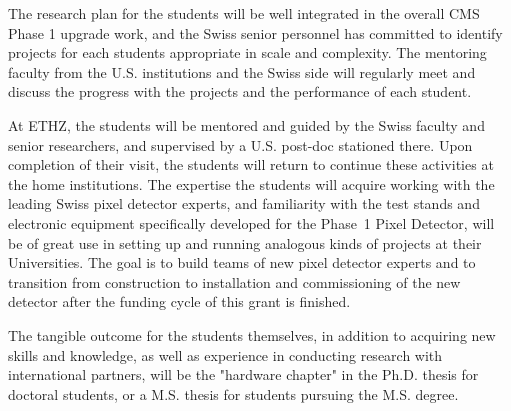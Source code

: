 The research plan for the students will be well integrated in the
overall CMS Phase 1 upgrade work, and the Swiss senior personnel has
committed to identify projects for each students appropriate in scale
and complexity. The mentoring faculty from the U.S. institutions and
the Swiss side will regularly meet and discuss the progress with the
projects and the performance of each student.

At ETHZ, the students will be mentored and guided by the Swiss faculty
and senior researchers, and supervised by a U.S. post-doc stationed
there. Upon completion of their visit, the students will return to
continue these activities at the home institutions.  The expertise the
students will acquire working with the leading Swiss pixel detector
experts, and familiarity with the test stands and electronic equipment
specifically developed for the Phase~1 Pixel Detector, will be of
great use in setting up and running analogous kinds of projects at
their Universities.
The goal is to build teams of new pixel detector experts and to
transition from construction to installation and commissioning of the
new detector after the funding cycle of this grant is finished.

The tangible outcome for the students themselves, in addition to
acquiring new skills and knowledge, as well as experience in conducting
research with international partners, will be the "hardware chapter"
in the Ph.D. thesis for doctoral students, or a M.S. thesis for
students pursuing the M.S. degree.
